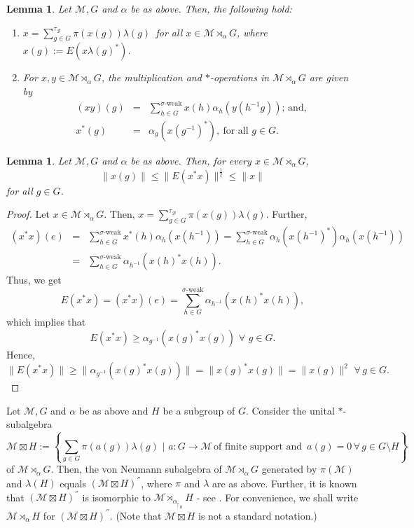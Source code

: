 \documentclass{amsart}
\numberwithin{equation}{section}
\newcommand{\mcal}{\mathcal}
\newcommand{\1}{\mathbf{1}}
\newtheorem{lemma}[theorem]{Lemma}
\begin{document}
\begin{lemma}\cite{M}
  Let $\mcal{M}, G$ and $\alpha$ be as above. Then, the following hold:
  \begin{enumerate}
\item $x = \sum^{\tau_{\mathcal{B}}}_{g\in G}\pi(x(g))\lambda(g)\,$
  for all $x \in \mcal{M}\rtimes_{\alpha}G$, where
  $x(g):=E(x\lambda(g)^*)$.
  \item For $x,y \in \mcal{M}\rtimes_{\alpha}G$, the multiplication
    and $*$-operations in $\mcal{M}\rtimes_{\alpha}G$ are given by
\begin{eqnarray*}
(xy)(g) & = & \sum^{\sigma\text{-}\mathrm{weak}}_{h\in
    G}x(h)\alpha_{h}(y(h^{-1}g));\,\text{and,}\\ x^{*}(g) & = &
  \alpha_{g}(x(g^{-1})^*),\ \text{for all } g\in G.
\end{eqnarray*} 
\end{enumerate}\end{lemma}

\begin{lemma}\label{inequality}
Let $\mcal{M}, G$ and $\alpha$ be as above. Then, for every $x\in
\mcal{M}\rtimes_{\alpha}G$, 
\[
\|x(g)\|\leq \|E(x^*x)\|^\frac{1}{2}\leq \|x\|
\]
for all $g\in G$.
\end{lemma}

\begin{proof}
Let $x\in \mcal{M}\rtimes_{\alpha}G$. Then, $x=
\sum^{\tau_{\mcal{B}}}_{g\in G}\pi(x(g))\lambda(g) $. Further,
\begin{eqnarray*}
(x^*x)(e)&=& \sum^{\sigma \text{-weak}}_{h\in
  G}x^*(h)\alpha_{h}(x(h^{-1}))= \sum^{\sigma \text{-weak}}_{h\in
  G}\alpha_{h}(x(h^{-1})^*)\alpha_{h}(x(h^{-1}))\\ &=& \sum^{\sigma
  \text{-weak}}_{h\in G} \alpha_{h^{-1}}(x(h)^*x(h)).
\end{eqnarray*}
Thus, we get  
$$
E(x^*x)= (x^*x)(e)= \sum^{\sigma \text{-}\mathrm{weak}}_{h\in G} \alpha_{h^{-1}}(x(h)^*x(h)),
$$
which implies that
\[
E(x^*x)\geq \alpha_{g^{-1}}(x(g)^*x(g))\,\,\forall\,\,g\in G.
\]
Hence, 
$$
\|E(x^*x)\|\geq \|\alpha_{g^{-1}}(x(g)^*x(g))\|= \|x(g)^*x(g)\|= \|x(g)\|^2\,\, \forall\,g\in G.
$$

\end{proof}

 Let $\mcal{M}, G$ and $\alpha$ be as above and $H$ be a subgroup of
$G$. Consider the unital $*$-subalgebra
\[
\mcal{M}\boxtimes H := \left\{\sum_{g\in G}\pi(a(g))\lambda(g)\,\,|\,\,a: G\rightarrow \mcal{M}\,\text{of finite support and } \,
 a(g)=0 \, \forall\,g \in G\setminus H\right\}
\]
of $\mcal{M}\rtimes_{\alpha} G$. Then, the von Neumann subalgebra of
$\mcal{M}\rtimes_{\alpha} G$ generated by $\pi(\mcal{M})$ and
$\lambda(H)$ equals $(\mcal{M}\boxtimes H)^{''}$, where $\pi$ and
$\lambda$ are as above. Further, it is known that $(\mcal{M}\boxtimes
H)^{''}$ is isomorphic to $\mcal{M}\rtimes_{\alpha_{\restriction_H}}
H$ - see \cite{Z-M}. For convenience, we shall write $\mcal{M}
\rtimes_{\alpha} H$ for $(\mcal{M}\boxtimes H)^{''}$.  (Note that
$\mcal{M}\boxtimes H$ is not a standard notation.)
\end{document}
